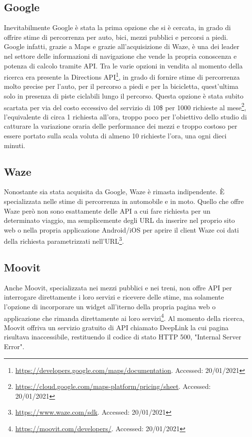 \subsection{Google}

Inevitabilmente Google è stata la prima opzione che si è cercata, in grado di offrire stime di percorrenza per auto, bici, mezzi pubblici e percorsi a piedi. Google infatti, grazie a Maps e grazie all'acquisizione di Waze, è una dei leader nel settore delle informazioni di navigazione che vende la propria conoscenza e potenza di calcolo tramite API. Tra le varie opzioni in vendita al momento della ricerca era presente la Directions API\footnote{\url{https://developers.google.com/maps/documentation}. Accessed: 20/01/2021}, in grado di fornire stime di percorrenza molto precise per l'auto, per il percorso a piedi e per la bicicletta, quest'ultima solo in presenza di piste ciclabili lungo il percorso. Questa opzione è stata subito scartata per via del costo eccessivo del servizio di 10\$ per 1000 richieste al mese\footnote{\url{https://cloud.google.com/maps-platform/pricing/sheet}. Accessed: 20/01/2021}, l'equivalente di circa 1 richiesta all'ora, troppo poco per l'obiettivo dello studio di catturare la variazione oraria delle performance dei mezzi e troppo costoso per essere portato sulla scala voluta di almeno 10 richieste l'ora, una ogni dieci minuti.

\subsection{Waze}

Nonostante sia stata acquisita da Google, Waze è rimasta indipendente. È specializzata nelle stime di percorrenza in automobile e in moto. Quello che offre Waze però non sono esattamente delle API a cui fare richiesta per un determinato viaggio, ma semplicemente degli URL da inserire nel proprio sito web o nella propria applicazione Android/iOS per aprire il client Waze coi dati della richiesta parametrizzati nell'URL\footnote{\url{https://www.waze.com/sdk}. Accessed: 20/01/2021}.

\subsection{Moovit}

Anche Moovit, specializzata nei mezzi pubblici e nei treni, non offre API per interrogare direttamente i loro servizi e ricevere delle stime, ma solamente l'opzione di incorporare un widget all'iterno della propria pagina web o applicazione che rimanda direttamente ai loro servizi\footnote{\url{https://moovit.com/developers/}. Accessed: 20/01/2021}. Al momento della ricerca, Moovit offriva un servizio gratuito di API chiamato DeepLink la cui pagina risultava inaccessibile, restituendo il codice di stato HTTP 500, "Internal Server Error".

